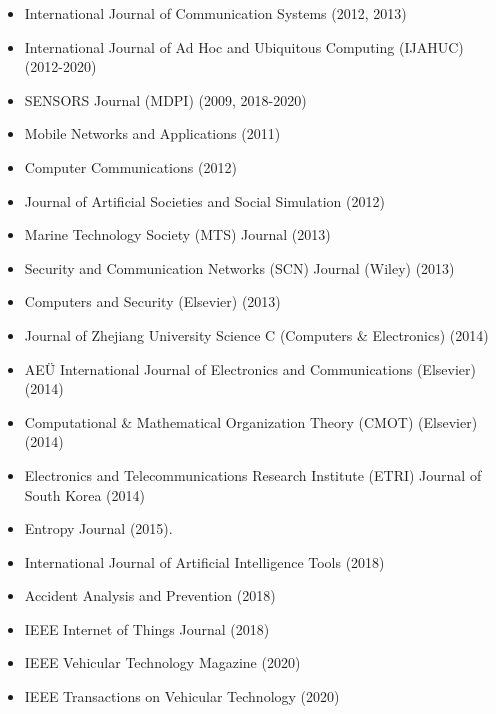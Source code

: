 \begin{itemize}
\item International Journal of Communication Systems (2012, 2013)

\item International Journal of Ad Hoc and Ubiquitous Computing (IJAHUC) (2012-2020)

\item SENSORS Journal (MDPI) (2009, 2018-2020)

\item Mobile Networks and Applications (2011)

\item Computer Communications (2012)

\item Journal of Artificial Societies and Social Simulation (2012)

\item Marine Technology Society (MTS) Journal (2013)

\item Security and Communication Networks (SCN) Journal (Wiley) (2013)

\item Computers and Security (Elsevier) (2013)

\item Journal of Zhejiang University Science C (Computers \& Electronics) (2014)

\item AE{\"U} International Journal of Electronics and Communications (Elsevier) (2014)

\item Computational \& Mathematical Organization Theory (CMOT) (Elsevier) (2014)

\item Electronics and Telecommunications Research Institute (ETRI) Journal of South Korea (2014)

\item Entropy Journal (2015).

\item International Journal of Artificial Intelligence Tools (2018) %

\item Accident Analysis and Prevention (2018) %

\item IEEE Internet of Things Journal (2018)

\item IEEE Vehicular Technology Magazine (2020)

\item IEEE Transactions on Vehicular Technology (2020)


\end{itemize}
